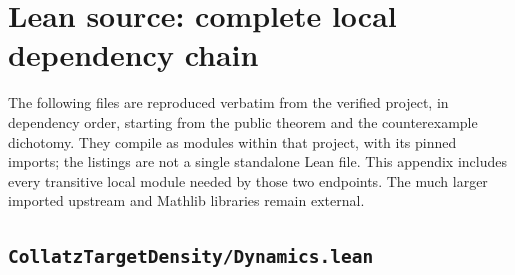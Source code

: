 \documentclass[11pt]{article}
\begin{document}
\appendix
\section{Lean source: complete local dependency chain}
The following files are reproduced verbatim from the verified project, in
dependency order, starting from the public theorem and the counterexample
dichotomy. They compile as modules within that project, with its pinned
imports; the listings are not a single standalone Lean file. This appendix
includes every transitive local module needed by those two endpoints.
The much larger imported upstream and Mathlib libraries remain external.
\subsection{\texorpdfstring{\texttt{CollatzTargetDensity/Dynamics.lean}}{CollatzTargetDensity/Dynamics.lean}}
\end{document}
